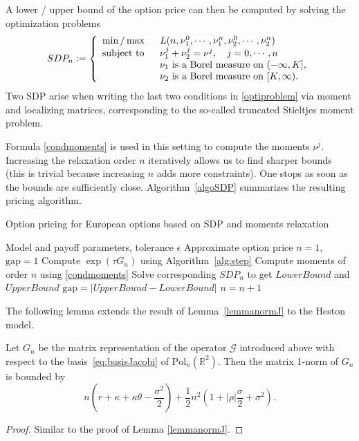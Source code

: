 A lower / upper bound of the option price can then be computed by solving the optimization problems 
 \begin{align} \label{optiproblem}
 SDP_n \mathrel{\mathop:}= \left\{
                \begin{array}{ll}
                  \min/ \max \hspace{0.1 cm}&L(n,\nu_1^0, \cdots, \nu_1^n,\nu_2^0, \cdots, \nu_2^n)\\
\text{subject to   }\hspace{0.1 cm}  &\nu_1^j+\nu_2^j=\nu^j, \quad j=0, \cdots, n\\ 
                  &\nu_1 \text{ is a Borel measure on } (- \infty , K],\\
                  &\nu_2 \text{ is a Borel measure on } [K,\infty).\\
		\end{array}
              \right.
\end{align}
Two SDP arise when writing the last two conditions in \eqref{optiproblem} via moment and localizing matrices, corresponding to the so-called truncated Stieltjes moment problem.

Formula \eqref{condmoments} is used in this setting to compute the moments $\nu^j$. Increasing the relaxation order $n$ iteratively allows us to find sharper bounds (this is trivial because increasing $n$ adds more constraints). One stops as soon as the bounds are sufficiently close. Algorithm~\ref{algoSDP} summarizes the resulting pricing algorithm.
\begin{algorithm}[ht]
\caption{Option pricing for European options based on SDP and moments relaxation}
\begin{algorithmic}[1]\label{algoSDP}
\REQUIRE Model and payoff parameters, tolerance $\epsilon$
\ENSURE Approximate option price
\STATE   $n=1$, $\mathrm{gap}=1$
\STATE Compute $\exp(\tau G_n)$ using Algorithm~\ref{alg:step}
\STATE Compute moments of order $n$ using \eqref{condmoments}
\STATE Solve corresponding $SDP_n$ to get $LowerBound$ and $UpperBound$ 
\STATE  $\mathrm{gap} = |UpperBound - LowerBound|$
\STATE  $n=n+1$
\ENDWHILE
\end{algorithmic}
\end{algorithm}

The following lemma extends the result of Lemma~\ref{lemmanormJ} to the Heston model.
\begin{lemma}
    \label{lem:heston_est}
Let $G_n$ be the matrix representation of the operator $\mathcal{G}$ introduced above with respect to the basis~\eqref{eq:basisJacobi} of $\mathrm{Pol}_{n}(\mathbb{R}^2)$.  
Then the matrix 1-norm of $G_n$ is bounded by
\begin{equation*}
n( r + \kappa + \kappa\theta - \frac{ \sigma^2}{2} ) + \frac12 n^2 ( 1 + |\rho| \frac{\sigma}{2} + \sigma^2).
\end{equation*}
\begin{proof}
Similar to the proof of Lemma \ref{lemmanormJ}.
\end{proof}
\end{lemma}


